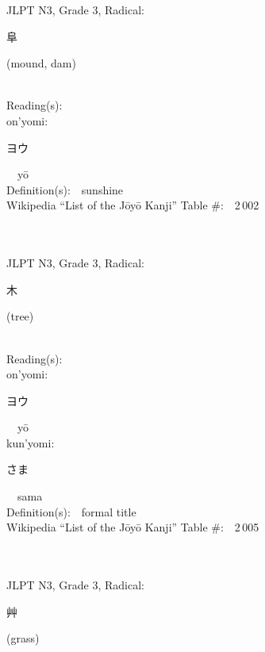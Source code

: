 \begin{multicols}{2}
{JLPT N3, Grade 3, Radical:\ \ {\begin{CJK}{UTF8}{min} 阜 \end{CJK}} (mound, dam) } \\
Reading(s):\ \ \\
{\hspace*{1em}}on'yomi:\ \ \\
{\hspace*{2em}}{\begin{CJK}{UTF8}{min} ヨウ \end{CJK}}\ \ y\=o\ \ \\
Definition(s):\ \ sunshine \\
Wikipedia ``List of the J\=oy\=o Kanji'' Table \#:\ \ 2\,002 \\
\ \ \\
{\fontsize{34pt}{40pt}  }\ \ \\  %
{JLPT N3, Grade 3, Radical:\ \ {\begin{CJK}{UTF8}{min} 木 \end{CJK}} (tree) } \\
Reading(s):\ \ \\
{\hspace*{1em}}on'yomi:\ \ \\
{\hspace*{2em}}{\begin{CJK}{UTF8}{min} ヨウ \end{CJK}}\ \ y\=o\ \ \\
{\hspace*{1em}}kun'yomi:\ \ \\
{\hspace*{2em}}{\begin{CJK}{UTF8}{min} さま \end{CJK}}\ \ sama\ \ \\
Definition(s):\ \ formal title \\
Wikipedia ``List of the J\=oy\=o Kanji'' Table \#:\ \ 2\,005 \\
\ \ \\
{\fontsize{34pt}{40pt}  }\ \ \\  %
{JLPT N3, Grade 3, Radical:\ \ {\begin{CJK}{UTF8}{min} 艸 \end{CJK}} (grass) } \\

\end{multicols}
